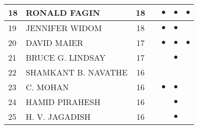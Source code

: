\documentclass[12pt,titlepage]{report}
\begin{document}
\begin{center}
\begin{tabular}{|l|l|c|c|c|c|c|}
\hline
18 & RONALD FAGIN & 18& & $\bullet$ & $\bullet$ & $\bullet$ \\
\hline
19 & JENNIFER WIDOM & 18& & $\bullet$ & $\bullet$ &         \\
\hline
20 & DAVID MAIER & 17& & $\bullet$ & $\bullet$ & $\bullet$ \\
\hline
21 & BRUCE G. LINDSAY & 17& &         & $\bullet$ &         \\
\hline
22 & SHAMKANT B. NAVATHE & 16& &         &         &         \\
\hline
23 & C. MOHAN & 16& & $\bullet$ & $\bullet$ &         \\
\hline
24 & HAMID PIRAHESH & 16& &         & $\bullet$ &         \\
\hline
25 & H. V. JAGADISH & 16& &         & $\bullet$ &         \\
\hline
\end{tabular}
\end{center}
\end{document}
